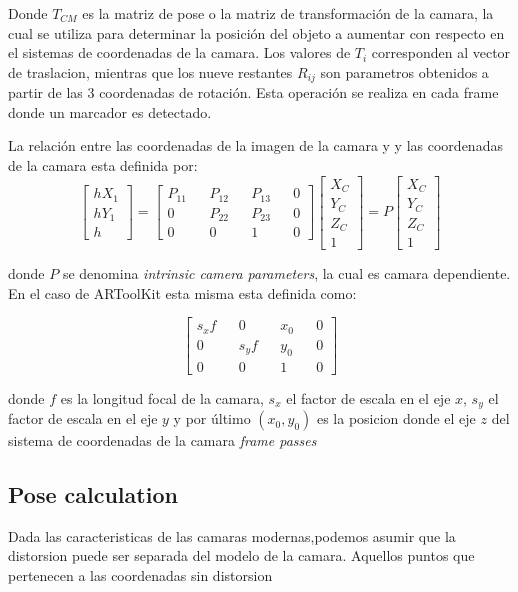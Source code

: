 \documentclass[runningheads]{llncs}
\begin{document}
Donde $ T_{CM} $ es la matriz de pose o la matriz de transformación de la camara, la cual se utiliza para determinar la posición del objeto a aumentar con respecto en el sistemas de coordenadas de la camara. Los valores de $T_{i}$ corresponden al vector de traslacion, mientras que los nueve restantes $R_{ij}$ son parametros obtenidos a partir de las 3 coordenadas de rotación.
Esta operación se realiza en cada frame donde un marcador es detectado.

La relación entre las coordenadas de la imagen de la camara y y las coordenadas de la camara esta definida por:
\[
\begin{bmatrix}
hX_{1} \\
hY_{1} \\
h 
\end{bmatrix} =
\begin{bmatrix}
P_{11} && P_{12} && P_{13} && 0\\ 
0 && P_{22} && P_{23} && 0\\
0 && 0 && 1 && 0
\end{bmatrix} 
\begin{bmatrix}
X_{C} \\
Y_{C} \\
Z_{C} \\
1
\end{bmatrix} = P \begin{bmatrix}
X_{C} \\
Y_{C} \\
Z_{C} \\
1
\end{bmatrix}
\]

donde $P$ se denomina \textit{intrinsic camera parameters}, la cual es camara dependiente. En el caso de ARToolKit esta misma esta definida como:

\[
\begin{bmatrix}
s_{x}f && 0 && x_{0} && 0\\ 
0 && s_{y}f && y_{0} && 0\\
0 && 0 && 1 && 0
\end{bmatrix} 
\]

donde $f$ es la longitud focal de la camara, $s_{x}$ el factor de escala en el eje $x$, $s_{y}$ el factor de escala en el eje $y$ y por último $(x_{0},y_{0})$ es la posicion donde el eje $z$ del sistema de coordenadas de la camara \textit{frame passes}


\subsection{Pose calculation}

Dada las caracteristicas de las camaras modernas,podemos asumir que la distorsion puede ser separada del modelo de la camara. Aquellos puntos que pertenecen a las coordenadas sin distorsion %
\end{document}
